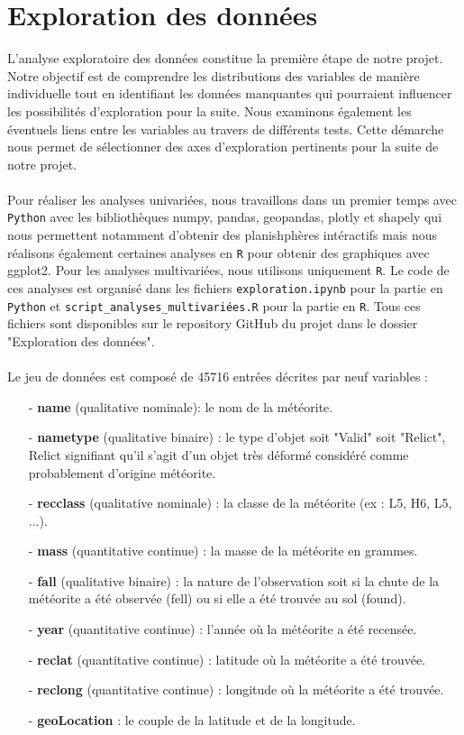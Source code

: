 \documentclass[12pt]{article}
\begin{document}
\section{Exploration des données}
L'analyse exploratoire des données constitue la première étape de notre projet. Notre objectif est de comprendre les distributions des variables de manière individuelle tout en identifiant les données manquantes qui pourraient influencer les possibilités d'exploration pour la suite. Nous examinons également les éventuels liens entre les variables au travers de différents tests. Cette démarche nous permet de sélectionner des axes d'exploration pertinents pour la suite de notre projet.\\
\\
Pour réaliser les analyses univariées, nous travaillons dans un premier temps avec \texttt{Python} avec les bibliothèques numpy, pandas, geopandas, plotly et shapely qui nous permettent notamment d'obtenir des planishphères intéractifs mais nous réalisons également certaines analyses en \texttt{R} pour obtenir des graphiques avec ggplot2. Pour les analyses multivariées, nous utilisons uniquement \texttt{R}. Le code de ces analyses est organisé dans les fichiers \texttt{exploration.ipynb} pour la partie en \texttt{Python} et \texttt{script\_analyses\_multivariées.R} pour la partie en \texttt{R}. Tous ces fichiers sont disponibles sur le repository GitHub du projet dans le dossier "Exploration des données".\\
\\
Le jeu de données est composé de 45716 entrées décrites par neuf variables :

{\setlength{\baselineskip}{1.5\baselineskip} %
\begin{itemize}
\item[-] \textbf{name} (qualitative nominale): le nom de la météorite.
\item[-] \textbf{nametype} (qualitative binaire) : le type d'objet soit "Valid" soit "Relict", Relict signifiant qu'il s'agit d'un objet très déformé considéré comme probablement d'origine météorite.
\item[-] \textbf{recclass} (qualitative nominale) : la classe de la météorite (ex : L5, H6, L5, ...).
\item[-] \textbf{mass} (quantitative continue) : la masse de la météorite en grammes.
\item[-] \textbf{fall} (qualitative binaire) : la nature de l'observation soit si la chute de la météorite a été observée (fell) ou si elle a été trouvée au sol (found).
\item[-] \textbf{year} (quantitative continue) : l'année où la météorite a été recensée.
\item[-] \textbf{reclat} (quantitative continue) : latitude où la météorite a été trouvée.
\item[-] \textbf{reclong} (quantitative continue) : longitude où la météorite a été trouvée.
\item[-] \textbf{geoLocation} : le couple de la latitude et de la longitude.\\
\end{itemize}
} %
\end{document}
